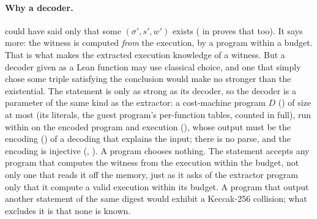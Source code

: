 \documentclass[11pt]{article}
\begin{document}
\paragraph{Why a decoder.}  could have said only that some
$(\sigma', s', w')$ exists ( in  proves that too). It says more: the
witness is computed \emph{from} the execution, by a program within a budget. That is what makes the
extracted execution knowledge of a witness. But a decoder given as a Lean function may use classical
choice, and one that simply chose some triple satisfying the conclusion would make
 no stronger than the existential. The statement is only as strong as
its decoder, so the decoder is a parameter of the same kind as the extractor: a cost-machine program
$D$ () of size at most  (its
literals, the guest program's per-function tables, counted in full), run within
 on the encoded program and execution
(), whose output must be the encoding () of a
decoding that explains the input; there is no parse, and the encoding is injective
(, ). A program chooses nothing. The statement
accepts any program that computes the witness from the execution within the budget, not only one
that reads it off the memory, just as it asks of the extractor program only that it compute a valid
execution within its budget. A program that output another statement of the same digest would
exhibit a Keccak-256 collision; what excludes it is that none is known.
\end{document}
